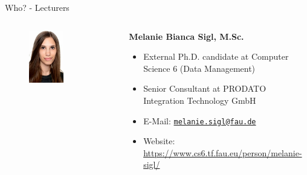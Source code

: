 \begin{frame}{Who? - Lecturers}
	\begin{columns}[T]
		\begin{column}{0.2\textwidth}
			\vspace{-1em}
			\begin{figure}[T]
				\centering
				\includegraphics[width=0.55\textwidth]{img/melanie_b_sigl.jpg}
			\end{figure}
		\end{column}
		\begin{column}{0.8\textwidth}
			\textbf{Melanie Bianca Sigl, M.Sc.}
			\begin{itemize}
				\item External Ph.D. candidate at Computer Science 6 (Data Management)
				\item Senior Consultant at PRODATO Integration Technology GmbH
				\item E-Mail: \texttt{\href{mailto:melanie.sigl@fau.de}{melanie.sigl@fau.de}}
				\item Website: \url{https://www.cs6.tf.fau.eu/person/melanie-sigl/}
			\end{itemize}
		\end{column}
	\end{columns}

	\vspace{2em}


\end{frame}
